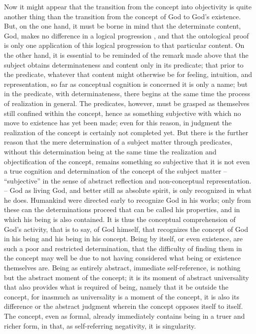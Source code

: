 Now it might appear that the transition from the concept into objectivity
is quite another thing than the transition from the concept of God to
God's existence.
But, on the one hand, it must be borne in mind that the
determinate content, God, makes no difference in a logical progression
, and
that the ontological proof is only one application of this logical progression
to that particular content.
On the other hand, it is essential to be reminded
of the remark made above that the subject obtains determinateness and
content only in its predicate;
that prior to the predicate, whatever that
content might otherwise be for feeling, intuition, and representation,
 so
far as conceptual cognition is concerned it is only a name;
 but in the
predicate, with determinateness, there begins at the same time the process
of realization in general.
The predicates, however, must be grasped as
themselves still confined within the concept,
 hence as something subjective
with which no move to existence has yet been made;
even for this reason,
in judgment the realization of the concept is certainly not completed yet.
But there is the further reason that the mere determination of a subject
matter through predicates,
 without this determination being at the same
time the realization and objectification of the concept,
 remains something
so subjective that it is not even a true cognition and determination of the
concept of the subject matter –
“subjective” in the sense of abstract reflection
and non-conceptual representation. –
God as living God, and better still as
absolute spirit, is only recognized in what he does.
 Humankind were directed
early to recognize God in his works; only from these can the determinations
proceed that can be called his properties, and in which his being is also
contained.
It is thus the conceptual comprehension of God's activity, that
is to say, of God himself,
that recognizes the concept of God in his being and
his being in his concept.
Being by itself, or even existence, are such a poor and
restricted determination, that the difficulty of finding them in the concept
may well be due to not having considered what being or existence themselves
are.
 Being as entirely abstract, immediate self-reference, is nothing but the
abstract moment of the concept;
 it is its moment of abstract universality
that also provides what is required of being,
 namely that it be outside the
concept, for inasmuch as universality is a moment of the concept,
 it is
also its difference or the abstract judgment
wherein the concept opposes itself to itself.
The concept, even as formal, already immediately contains
being in a truer and richer form,
in that, as self-referring negativity, it is singularity.

